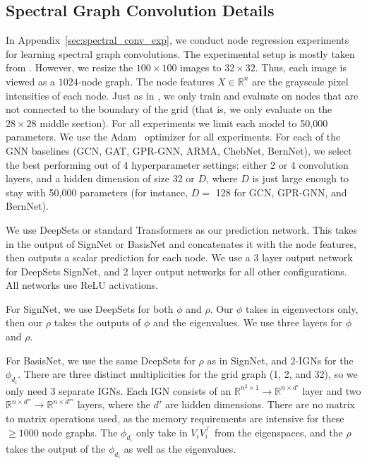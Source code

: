 \documentclass{article} \usepackage{iclr2023_conference,times}
\newcommand{\RR}{\mathbb R}
\begin{document}
\subsection{Spectral Graph Convolution Details}

In Appendix~\ref{sec:spectral_conv_exp}, we conduct node regression experiments for learning spectral graph convolutions. The experimental setup is mostly taken from \cite{he2021bernnet}. However, we resize the $100 \times 100$ images to $32 \times 32$. Thus, each image is viewed as a $1024$-node graph. The node features $X \in \RR^n$ are the grayscale pixel intensities of each node. Just as in \cite{he2021bernnet}, we only train and evaluate on nodes that are not connected to the boundary of the grid (that is, we only evaluate on the $28 \times 28$ middle section). For all experiments we limit each model to 50,000 parameters. We use the Adam~\citep{kingma2014adam} optimizer for all experiments. For each of the GNN baselines (GCN, GAT, GPR-GNN, ARMA, ChebNet, BernNet), we select the best performing out of 4 hyperparameter settings: either 2 or 4 convolution layers, and a hidden dimension of size 32 or $D$, where $D$ is just large enough to stay with 50,000 parameters (for instance, $D = $ 128 for GCN, GPR-GNN, and BernNet).

We use DeepSets or standard Transformers as our prediction network. This takes in the output of SignNet or BasisNet and concatenates it with the node features, then outputs a scalar prediction for each node. We use a 3 layer output network for DeepSets SignNet, and 2 layer output networks for all other configurations. All networks use ReLU activations.

For SignNet, we use DeepSets for both $\phi$ and $\rho$. Our $\phi$ takes in eigenvectors only, then our $\rho$ takes the outputs of $\phi$ and the eigenvalues. We use three layers for $\phi$ and $\rho$.

For BasisNet, we use the same DeepSets for $\rho$ as in SignNet, and 2-IGNs for the $\phi_{d_i}$. There are three distinct multiplicities for the grid graph (1, 2, and 32), so we only need 3 separate IGNs. Each IGN consists of an $\RR^{n^2 \times 1} \to \RR^{n \times d'}$ layer and two $\RR^{n \times d''} \to \RR^{n \times d'''}$ layers, where the $d'$ are hidden dimensions. There are no matrix to matrix operations used, as the memory requirements are intensive for these $\geq 1000$ node graphs. The $\phi_{d_i}$ only take in $V_i V_i^\top$ from the eigenspaces, and the $\rho$ takes the output of the $\phi_{d_i}$ as well as the eigenvalues.
\end{document}
